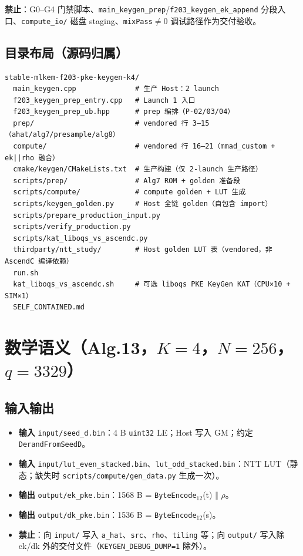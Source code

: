 \documentclass[UTF8,a4paper,11pt]{ctexart}
\begin{document}
\textbf{禁止}：G0--G4 门禁脚本、\texttt{main\_keygen\_prep}/\texttt{f203\_keygen\_ek\_append} 分段入口、\texttt{compute\_io/} 磁盘 staging、\texttt{mixPass}$\neq$0 调试路径作为交付验收。

\subsection{目录布局（源码归属）}

\begin{verbatim}
stable-mlkem-f203-pke-keygen-k4/
  main_keygen.cpp              # 生产 Host：2 launch
  f203_keygen_prep_entry.cpp   # Launch 1 入口
  f203_keygen_prep_ub.hpp      # prep 编排（P-02/03/04）
  prep/                        # vendored 行 3–15（ahat/alg7/presample/alg8）
  compute/                     # vendored 行 16–21（mmad_custom + ek||rho 融合）
  cmake/keygen/CMakeLists.txt  # 生产构建（仅 2-launch 生产路径）
  scripts/prep/                # Alg7 ROM + golden 准备段
  scripts/compute/             # compute golden + LUT 生成
  scripts/keygen_golden.py     # Host 全链 golden（自包含 import）
  scripts/prepare_production_input.py
  scripts/verify_production.py
  scripts/kat_liboqs_vs_ascendc.py
  thirdparty/ntt_study/        # Host golden LUT 表（vendored，非 AscendC 编译依赖）
  run.sh
  kat_liboqs_vs_ascendc.sh     # 可选 liboqs PKE KeyGen KAT（CPU×10 + SIM×1）
  SELF_CONTAINED.md
\end{verbatim}

\section{数学语义（Alg.13，$K=4$，$N=256$，$q=3329$）}

\subsection{输入输出}

\begin{itemize}
  \item \textbf{输入} \texttt{input/seed\_d.bin}：4 B \texttt{uint32} LE；Host 写入 GM；约定 \texttt{DerandFromSeedD}。
  \item \textbf{输入} \texttt{input/lut\_even\_stacked.bin}、\texttt{lut\_odd\_stacked.bin}：NTT LUT（静态；缺失时 \texttt{scripts/compute/gen\_data.py} 生成一次）。
  \item \textbf{输出} \texttt{output/ek\_pke.bin}：1568 B = \texttt{ByteEncode$_{12}$}(t) $\Vert$ $\rho$。
  \item \textbf{输出} \texttt{output/dk\_pke.bin}：1536 B = \texttt{ByteEncode$_{12}$}(s)。
  \item \textbf{禁止}：向 \texttt{input/} 写入 \texttt{a\_hat}、\texttt{src}、\texttt{rho}、\texttt{tiling} 等；向 \texttt{output/} 写入除 ek/dk 外的交付文件（\texttt{KEYGEN\_DEBUG\_DUMP=1} 除外）。
\end{itemize}
\end{document}
